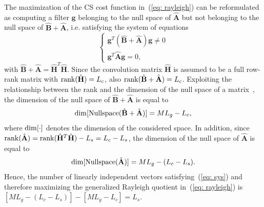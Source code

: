 \documentclass[10pt]{IEEEtran}
\begin{document}
The maximization of the CS cost function in~(\ref{eq: rayleigh}) can be reformulated as computing a filter $\mathbf{g}$ belonging to the null space of $\hat{\mathbf{A}}$ but not belonging to the null space of $\hat{\mathbf{B}} + \hat{\mathbf{A}}$, i.e. satisfying the system of equations
\begin{equation}
\label{eq: sys}
\begin{cases}
\mathbf{g}^T (\hat{\mathbf{B}} + \hat{\mathbf{A}})\mathbf{g} \neq 0 \\
\mathbf{g}^T\hat{\mathbf{A}} \mathbf{g} = 0,
\end{cases}
\end{equation}
 with $\hat{\mathbf{B}} + \hat{\mathbf{A}} = \hat{\mathbf{H}}^T\hat{\mathbf{H}}$.
Since the convolution matrix $\hat{\mathbf{H}}$ is assumed to be a full row-rank matrix with ${\rm rank}(\hat{\mathbf{H}}) = L_c$, also ${\rm rank}(\hat{\mathbf{B}} + \hat{\mathbf{A}}) = L_c$.
Exploiting the relationship between the rank and the dimension of the null space of a matrix~\cite{Golub_Matrix_book}, the dimension of the null space of $\hat{\mathbf{B}} + \hat{\mathbf{A}}$ is equal to
\begin{eqnarray}
{\rm dim}[{\rm Nullspace} (\hat{\mathbf{B}} + \hat{\mathbf{A}})] = ML_g - L_c,
\end{eqnarray}
where $\rm{dim}[ \cdot]$ denotes the dimension of the considered space.
In addition, since ${\rm rank}(\hat{\mathbf{A}}) = {\rm rank}(\hat{\mathbf{H}}^T \hat{\mathbf{H}}) - L_s = L_c - L_s$, the dimension of the null space of $\hat{\mathbf{A}}$ is equal to
\begin{eqnarray}
{\rm dim}[{\rm Nullspace} (\hat{\mathbf{A}})] = ML_g - (L_c - L_s).
\end{eqnarray}
Hence, the number of linearly independent vectors satisfying~(\ref{eq: sys}) and therefore maximizing the generalized Rayleigh quotient in~(\ref{eq: rayleigh}) is $[ML_g-(L_c-L_s)] - [ML_g-L_c] = L_s$.
\end{document}
